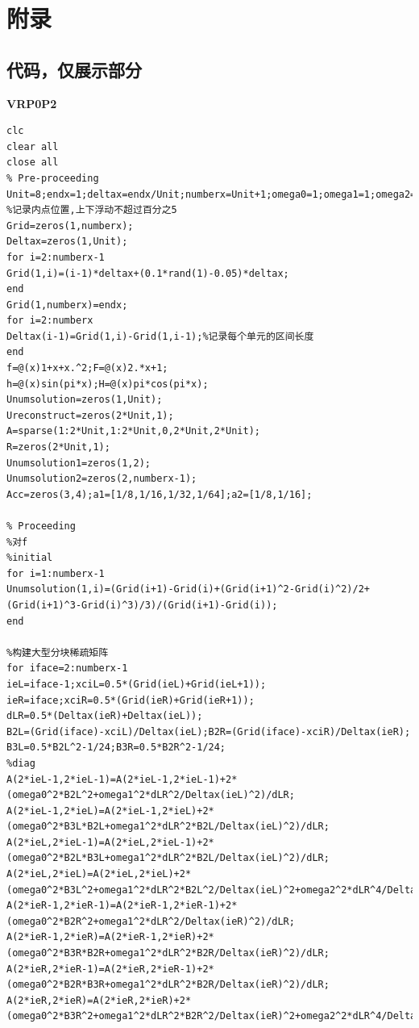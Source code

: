 \documentclass[a4paper,11pt,UTF8]{article}%
\theoremstyle{plain}
\begin{document}
\section{附录}
\subsection{代码，仅展示部分}
\noindent \textbf{VRP0P2}
\lstset{language=Matlab}%
\lstset{breaklines}%
\lstset{extendedchars=false}%
\begin{lstlisting}
clc
clear all
close all
% Pre-proceeding
Unit=8;endx=1;deltax=endx/Unit;numberx=Unit+1;omega0=1;omega1=1;omega2=0.5;omegab=omega0/sqrt(2);
%记录内点位置,上下浮动不超过百分之5
Grid=zeros(1,numberx);
Deltax=zeros(1,Unit);
for i=2:numberx-1
Grid(1,i)=(i-1)*deltax+(0.1*rand(1)-0.05)*deltax;
end
Grid(1,numberx)=endx;
for i=2:numberx
Deltax(i-1)=Grid(1,i)-Grid(1,i-1);%记录每个单元的区间长度
end
f=@(x)1+x+x.^2;F=@(x)2.*x+1;
h=@(x)sin(pi*x);H=@(x)pi*cos(pi*x);
Unumsolution=zeros(1,Unit);
Ureconstruct=zeros(2*Unit,1);
A=sparse(1:2*Unit,1:2*Unit,0,2*Unit,2*Unit);
R=zeros(2*Unit,1);
Unumsolution1=zeros(1,2);
Unumsolution2=zeros(2,numberx-1);
Acc=zeros(3,4);a1=[1/8,1/16,1/32,1/64];a2=[1/8,1/16];

% Proceeding
%对f
%initial 
for i=1:numberx-1
Unumsolution(1,i)=(Grid(i+1)-Grid(i)+(Grid(i+1)^2-Grid(i)^2)/2+(Grid(i+1)^3-Grid(i)^3)/3)/(Grid(i+1)-Grid(i));
end

%构建大型分块稀疏矩阵
for iface=2:numberx-1
ieL=iface-1;xciL=0.5*(Grid(ieL)+Grid(ieL+1));
ieR=iface;xciR=0.5*(Grid(ieR)+Grid(ieR+1));
dLR=0.5*(Deltax(ieR)+Deltax(ieL));
B2L=(Grid(iface)-xciL)/Deltax(ieL);B2R=(Grid(iface)-xciR)/Deltax(ieR);
B3L=0.5*B2L^2-1/24;B3R=0.5*B2R^2-1/24;
%diag
A(2*ieL-1,2*ieL-1)=A(2*ieL-1,2*ieL-1)+2*(omega0^2*B2L^2+omega1^2*dLR^2/Deltax(ieL)^2)/dLR;
A(2*ieL-1,2*ieL)=A(2*ieL-1,2*ieL)+2*(omega0^2*B3L*B2L+omega1^2*dLR^2*B2L/Deltax(ieL)^2)/dLR;
A(2*ieL,2*ieL-1)=A(2*ieL,2*ieL-1)+2*(omega0^2*B2L*B3L+omega1^2*dLR^2*B2L/Deltax(ieL)^2)/dLR;
A(2*ieL,2*ieL)=A(2*ieL,2*ieL)+2*(omega0^2*B3L^2+omega1^2*dLR^2*B2L^2/Deltax(ieL)^2+omega2^2*dLR^4/Deltax(ieL)^4)/dLR;
A(2*ieR-1,2*ieR-1)=A(2*ieR-1,2*ieR-1)+2*(omega0^2*B2R^2+omega1^2*dLR^2/Deltax(ieR)^2)/dLR;
A(2*ieR-1,2*ieR)=A(2*ieR-1,2*ieR)+2*(omega0^2*B3R*B2R+omega1^2*dLR^2*B2R/Deltax(ieR)^2)/dLR;
A(2*ieR,2*ieR-1)=A(2*ieR,2*ieR-1)+2*(omega0^2*B2R*B3R+omega1^2*dLR^2*B2R/Deltax(ieR)^2)/dLR;
A(2*ieR,2*ieR)=A(2*ieR,2*ieR)+2*(omega0^2*B3R^2+omega1^2*dLR^2*B2R^2/Deltax(ieR)^2+omega2^2*dLR^4/Deltax(ieR)^4)/dLR;


\end{lstlisting}
\end{document}
